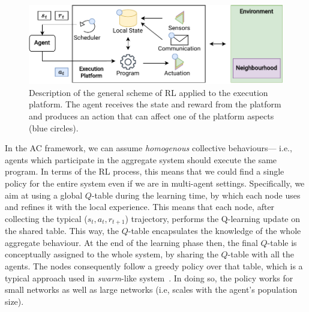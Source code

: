 \begin{figure}
	\centering
    \includegraphics[width=\linewidth]{papers/acsos2022/img//rl-architecture.pdf}
    \caption[Description of the general scheme of \ac{RL} applied to the execution platform.]{Description of the general scheme of \ac{RL} applied to the execution platform. 
    The agent receives the state and reward from the platform and produces an action that can affect one of the platform aspects (blue circles).}
    \label{acsos2022:fig:rl-and-ac}
\end{figure}
In the \ac{AC} framework, 
 we can assume \emph{homogenous} collective behaviours---
 i.e., agents which participate in the aggregate system should execute the same program. 
 In terms of the \ac{RL} process, this means that we could find a single policy for the entire system even if we are in multi-agent settings.%
Specifically, we aim at using a global $Q$-table during the learning time, 
 by which each node uses and refines it with the local experience.
This means that each node, after collecting the typical ($s_t, a_t, r_{t+1}$) trajectory,
 performs the Q-learning update on the shared table.
%
 This way, the $Q$-table encapsulates the knowledge of the whole aggregate behaviour.
%
At the end of the learning phase then, 
 the final $Q$-table is conceptually assigned to the whole system, by sharing the $Q$-table with all the agents.
%
 The nodes consequently follow a greedy policy over that table, 
 which is a typical approach used in \emph{swarm}-like system~\cite{DBLP:journals/jmlr/HuttenrauchSN19, DBLP:conf/atal/SosicKZK17}.
%
In doing so, the policy works for small networks as well as large networks  (i.e, scales with the agent's population size).

